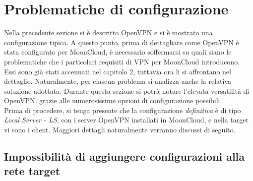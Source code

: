 \section{Problematiche di configurazione}
Nella precedente sezione si è descritto OpenVPN e si è mostrato una configurazione
tipica. A questo punto, prima di dettagliare come OpenVPN è stata configurato
per MoonCloud, è necessario soffermarsi su quali siano le problematiche che i particolari
requisiti di VPN per MoonCloud introducono. Essi sono già stati accennati
nel capitolo 2, tuttavia ora li si affrontano nel dettaglio. Naturalmente, per
ciascun problema si analizza anche la relativa soluzione adottata. Durante
questa sezione si potrà notare l'elevata versatilità di OpenVPN, grazie alle numerosissime
opzioni di configurazione possibili.\\
Prima di procedere, si tenga presente che la configurazione \textit{definitiva}
è di tipo \textit{Local Server - LS}, con i server OpenVPN installati
in MoonCloud, e nella target vi sono i client. Maggiori dettagli naturalmente verranno
discussi di seguito.

\subsection{Impossibilità di aggiungere configurazioni alla rete target}\label{subsec:client-nat}
